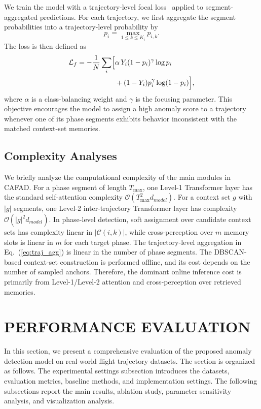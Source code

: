 \documentclass[iicol,pdflatex,sn-basic,Numbered]{sn-jnl}%
\theoremstyle{thmstyleone}%
\theoremstyle{thmstyletwo}%
\theoremstyle{thmstylethree}%
\begin{document}
We train the model with a trajectory-level focal loss~\cite{lin2017focal} applied to segment-aggregated predictions.
For each trajectory, we first aggregate the segment probabilities into a trajectory-level probability by
\begin{equation}
\label{eq:traj_agg}
p_i = \max_{1 \le k \le K_i} p_{i,k}.
\end{equation}
The loss is then defined as
\begin{equation}
\label{eq:focal_loss}
\begin{aligned}
\mathcal{L}_f = -\frac{1}{N} \sum_i \Bigl[
&\alpha\,Y_i(1-p_i)^{\gamma}\log p_i\\
&+ (1-Y_i)p_i^{\gamma}\log(1-p_i)
\Bigr],
\end{aligned}
\end{equation}
where $\alpha$ is a class-balancing weight and $\gamma$ is the focusing parameter.
This objective encourages the model to assign a high anomaly score to a trajectory whenever one of its phase segments exhibits behavior inconsistent with the matched context-set memories.

\subsection{Complexity Analyses}
We briefly analyze the computational complexity of the main modules in CAFAD.
For a phase segment of length $T_{\max}$, one Level-1 Transformer layer has the standard self-attention complexity $\mathcal{O}(T_{\max}^{2}d_{model})$.
For a context set $g$ with $|g|$ segments, one Level-2 inter-trajectory Transformer layer has complexity $\mathcal{O}(|g|^{2}d_{model})$.
In phase-level detection, soft assignment over candidate context sets has complexity linear in $|\mathcal{C}(i,k)|$, while cross-perception over $m$ memory slots is linear in $m$ for each target phase.
The trajectory-level aggregation in Eq.~(\ref{eq:traj_agg}) is linear in the number of phase segments.
The DBSCAN-based context-set construction is performed offline, and its cost depends on the number of sampled anchors.
Therefore, the dominant online inference cost is primarily from Level-1/Level-2 attention and cross-perception over retrieved memories.

\section{PERFORMANCE EVALUATION}\label{sec:performance_evaluation}
In this section, we present a comprehensive evaluation of the proposed anomaly detection model on real-world flight trajectory datasets.
The section is organized as follows.
The experimental settings subsection introduces the datasets, evaluation metrics, baseline methods, and implementation settings.
The following subsections report the main results, ablation study, parameter sensitivity analysis, and visualization analysis.
\end{document}
